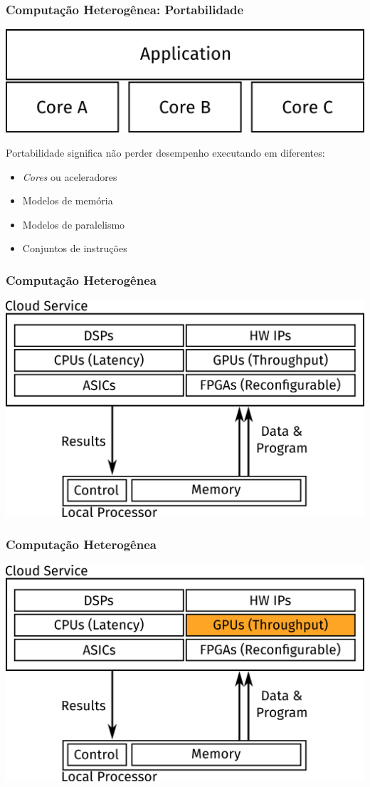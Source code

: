 \documentclass[10pt, compress]{beamer}
\begin{document}
\begin{frame}
    \frametitle{Computação Heterogênea: Portabilidade}
    \begin{center}
        \includegraphics[width=.7\textwidth]{portability}
    \end{center}

    \alert{Portabilidade} significa não perder desempenho
        executando em diferentes:
    \begin{itemize}
        \item \textit{Cores} ou \alert{aceleradores}
            \pause
        \item Modelos de memória
            \pause
        \item Modelos de paralelismo
            \pause
        \item Conjuntos de instruções
    \end{itemize}
\end{frame}

\begin{frame}
    \frametitle{Computação Heterogênea}
    \centering
    \includegraphics[width=.85\textwidth]{heterogeneous}
\end{frame}

\begin{frame}
    \frametitle{Computação Heterogênea}
    \centering
    \includegraphics[width=.85\textwidth]{heterogeneous_highlight}
\end{frame}
\end{document}
